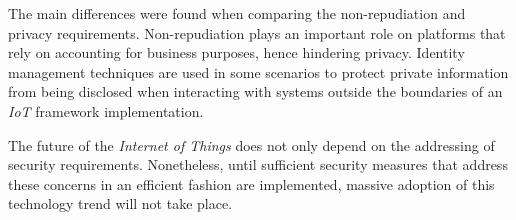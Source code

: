 \documentclass[journal]{IEEEtran}
\begin{document}
  The main differences were found when comparing the non-repudiation and privacy requirements. Non-repudiation plays an important role on platforms that rely on accounting for business purposes, hence hindering privacy. Identity management techniques are used in some scenarios to protect private information from being disclosed when interacting with systems outside the boundaries of an \emph{IoT} framework implementation.

  The future of the \emph{Internet of Things} does not only depend on the addressing of security requirements. Nonetheless, until sufficient security measures that address these concerns in an efficient fashion are implemented, massive adoption of this technology trend will not take place. 
  
  



\end{document}
